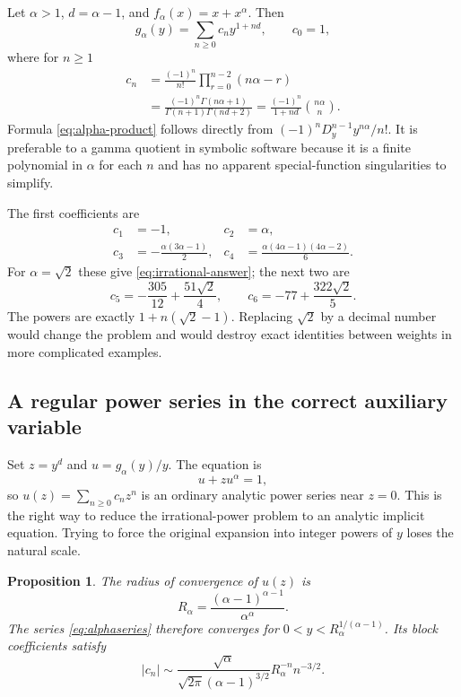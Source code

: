\documentclass[11pt,a4paper]{article}
\newtheorem{proposition}[theorem]{Proposition}
\theoremstyle{definition}
\theoremstyle{remark}
\begin{document}
Let $\alpha>1$, $d=\alpha-1$, and $f_\alpha(x)=x+x^\alpha$. Then
\begin{equation}\label{eq:alphaseries}
 g_\alpha(y)=\sum_{n\ge0}c_n y^{1+nd},\qquad
 c_0=1,
\end{equation}
where for $n\ge1$
\begin{align}
 c_n
 &=\frac{(-1)^n}{n!}\prod_{r=0}^{n-2}(n\alpha-r)\label{eq:alpha-product}\\
 &=\frac{(-1)^n\Gamma(n\alpha+1)}
         {\Gamma(n+1)\Gamma(nd+2)}
  =\frac{(-1)^n}{1+nd}\binom{n\alpha}{n}.
 \label{eq:alpha-gamma}
\end{align}
Formula \eqref{eq:alpha-product} follows directly from
$(-1)^nD_y^{n-1}y^{n\alpha}/n!$. It is preferable to a gamma quotient in symbolic
software because it is a finite polynomial in $\alpha$ for each $n$ and has no
apparent special-function singularities to simplify.

The first coefficients are
\begin{align*}
 c_1&=-1,&c_2&=\alpha,\\
 c_3&=-\frac{\alpha(3\alpha-1)}2,&
 c_4&=\frac{\alpha(4\alpha-1)(4\alpha-2)}6.
\end{align*}
For $\alpha=\sqrt2$ these give \eqref{eq:irrational-answer}; the next two are
\[
 c_5=-\frac{305}{12}+\frac{51\sqrt2}{4},\qquad
 c_6=-77+\frac{322\sqrt2}{5}.
\]
The powers are exactly $1+n(\sqrt2-1)$. Replacing $\sqrt2$ by a decimal number
would change the problem and would destroy exact identities between weights
in more complicated examples.

\subsection{A regular power series in the correct auxiliary variable}

Set $z=y^d$ and $u=g_\alpha(y)/y$. The equation is
\begin{equation}\label{eq:ualpha}
 u+zu^\alpha=1,
\end{equation}
so $u(z)=\sum_{n\ge0}c_nz^n$ is an ordinary analytic power series near $z=0$.
This is the right way to reduce the irrational-power problem to an analytic
implicit equation. Trying to force the original expansion into integer powers
of $y$ loses the natural scale.

\begin{proposition}\label{prop:radius}
The radius of convergence of $u(z)$ is
\begin{equation}\label{eq:radius}
 R_\alpha=\frac{(\alpha-1)^{\alpha-1}}{\alpha^\alpha}.
\end{equation}
The series \eqref{eq:alphaseries} therefore converges for
$0<y<R_\alpha^{1/(\alpha-1)}$. Its block coefficients satisfy
\begin{equation}\label{eq:stirling-coeff}
 |c_n|\sim\frac{\sqrt\alpha}{\sqrt{2\pi}(\alpha-1)^{3/2}}
 R_\alpha^{-n}n^{-3/2}.
\end{equation}
\end{proposition}
\end{document}
